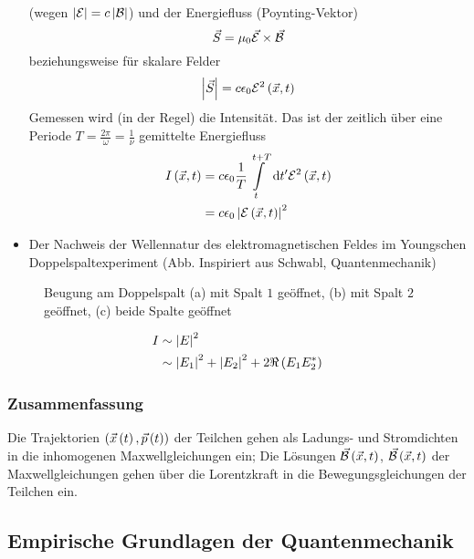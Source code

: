 \begin{itemize}
  (wegen $\left\lvert \mathcal{E} \right\rvert = c\left\lvert \mathcal{B} \right\rvert$) und der Energiefluss (Poynting-Vektor)
  \begin{equation}
    \vec{S} =\mu_0 \vec{\mathcal{E}}\times\vec{\mathcal{B}}
  \end{equation}
  beziehungsweise für skalare Felder
  \begin{equation}
    \left\lvert \vec{S} \right\rvert = c \epsilon_0 \mathcal{E}^2\left(\vec{x},t\right)
  \end{equation}
  Gemessen wird (in der Regel) die Intensität. Das ist der zeitlich über eine Periode $T = \frac{2\pi}{\omega} = \frac{1}{\nu}$ gemittelte Energiefluss
  \begin{align}
    I\left(\vec{x},t\right) & = c \epsilon_0 \frac{1}{T} \int\limits_t^{t+T} \,\text d{t'} \mathcal{E}^2\left(\vec{x},t\right) \\
               & = c \epsilon_0 \left\lvert \mathcal{E}\left(\vec{x},t\right) \right\rvert^2
  \end{align}
  \item Der Nachweis der Wellennatur des elektromagnetischen Feldes im Youngschen Doppelspaltexperiment (Abb. Inspiriert aus Schwabl, Quantenmechanik)
\end{itemize}

\begin{figure}[H]
  \centering
  
  \caption{Beugung am Doppelspalt (a) mit Spalt $1$ geöffnet, (b) mit Spalt $2$ geöffnet, (c) beide Spalte geöffnet}
\end{figure}

\begin{align}
  I & \sim \left\lvert E \right\rvert^2 \\
    & \sim \left\lvert E_1 \right\rvert^2 + \left\lvert E_2 \right\rvert^2 + 2 \Re\left(E_1E_2^*\right)
\end{align}

\subsubsection{Zusammenfassung}

\begin{table}[H]
  \centering
  
\end{table}

Die Trajektorien $\left( \vec{x}\left(t\right),\vec{p}\left(t\right) \right)$ der Teilchen gehen als Ladungs- und Stromdichten in die inhomogenen Maxwellgleichungen ein; Die Lösungen $\vec{\mathcal{B}}\left(\vec{x},t\right)$, $\vec{\mathcal{B}}\left(\vec{x},t\right)$ der Maxwellgleichungen gehen über die Lorentzkraft in die Bewegungsgleichungen der Teilchen ein.

\subsection{Empirische Grundlagen der Quantenmechanik}


